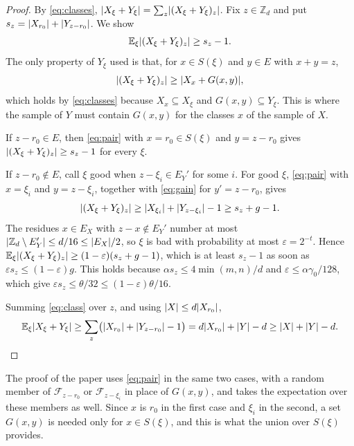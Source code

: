 \documentclass[11pt]{amsart}
\theoremstyle{remark}
\newcommand{\Z}{\mathbb{Z}}
\newcommand{\E}{\mathbb{E}}
\DeclarePairedDelimiter{\abs}{\lvert}{\rvert}
\begin{document}
\begin{proof}
By \eqref{eq:classes}, $\abs{X_\xi + Y_\xi} = \sum_z \abs{(X_\xi + Y_\xi)_z}$. Fix $z \in \Z_d$ and
put $s_z = \abs{X_{r_0}} + \abs{Y_{z - r_0}}$. We show
\begin{equation}\label{eq:class}
  \E_\xi \abs{(X_\xi + Y_\xi)_z} \ge s_z - 1 .
\end{equation}
The only property of $Y_\xi$ used is that, for $x \in S(\xi)$ and $y \in E$ with $x + y = z$,
\begin{equation}\label{eq:pair}
  \abs{(X_\xi + Y_\xi)_z} \ge \abs{X_x + G(x, y)} ,
\end{equation}
which holds by \eqref{eq:classes} because $X_x \subseteq X_\xi$ and $G(x, y) \subseteq Y_\xi$.
This is where the sample of $Y$ must contain $G(x, y)$ for the classes $x$ of the sample of $X$.

If $z - r_0 \in E$, then \eqref{eq:pair} with $x = r_0 \in S(\xi)$ and $y = z - r_0$ gives
$\abs{(X_\xi + Y_\xi)_z} \ge s_z - 1$ for every $\xi$.

If $z - r_0 \notin E$, call $\xi$ good when $z - \xi_i \in E_Y'$ for some $i$. For good $\xi$,
\eqref{eq:pair} with $x = \xi_i$ and $y = z - \xi_i$, together with \eqref{eq:gain} for
$y' = z - r_0$, gives
\[
  \abs{(X_\xi + Y_\xi)_z} \ge \abs{X_{\xi_i}} + \abs{Y_{z - \xi_i}} - 1 \ge s_z + g - 1 .
\]
The residues $x \in E_X$ with $z - x \notin E_Y'$ number at most
$\abs{\Z_d \setminus E_Y'} \le d/16 \le \abs{E_X}/2$, so $\xi$ is bad with probability at most
$\varepsilon = 2^{-t}$. Hence
$\E_\xi \abs{(X_\xi + Y_\xi)_z} \ge (1 - \varepsilon)(s_z + g - 1)$, which is at least $s_z - 1$
as soon as $\varepsilon s_z \le (1 - \varepsilon) g$. This holds because
$\alpha s_z \le 4\min(m, n)/d$ and $\varepsilon \le \alpha\gamma_0/128$, which give
$\varepsilon s_z \le \theta/32 \le (1 - \varepsilon)\theta/16$.

Summing \eqref{eq:class} over $z$, and using $\abs{X} \le d \abs{X_{r_0}}$,
\[
  \E_\xi \abs{X_\xi + Y_\xi}
  \ge \sum_z \bigl(\abs{X_{r_0}} + \abs{Y_{z - r_0}} - 1\bigr)
  = d \abs{X_{r_0}} + \abs{Y} - d
  \ge \abs{X} + \abs{Y} - d . \qedhere
\]
\end{proof}

The proof of the paper uses \eqref{eq:pair} in the same two cases, with a random member of
$\mathcal F_{z - r_0}$ or $\mathcal F_{z - \xi_i}$ in place of $G(x, y)$, and takes the expectation
over these members as well. Since $x$ is $r_0$ in the first case and $\xi_i$ in the second, a set
$G(x, y)$ is needed only for $x \in S(\xi)$, and this is what the union over $S(\xi)$ provides.
\end{document}
